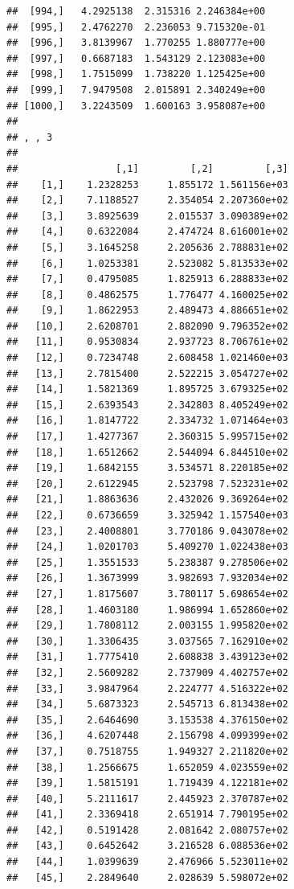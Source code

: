 \documentclass[article]{jss}\usepackage[]{graphicx}\usepackage[]{xcolor}
\makeatletter
\newenvironment{kframe}{%
 \def\at@end@of@kframe{}%
 \ifinner\ifhmode%
  \def\at@end@of@kframe{\end{minipage}}%
  \begin{minipage}{\columnwidth}%
 \fi\fi%
 \def\FrameCommand##1{\hskip\@totalleftmargin \hskip-\fboxsep
 \colorbox{shadecolor}{##1}\hskip-\fboxsep
     \hskip-\linewidth \hskip-\@totalleftmargin \hskip\columnwidth}%
 \MakeFramed {\advance\hsize-\width
   \@totalleftmargin\z@ \linewidth\hsize
   \@setminipage}}%
 {\par\unskip\endMakeFramed%
 \at@end@of@kframe}
\newenvironment{knitrout}{}{} %
\makeatother
\begin{document}
\begin{knitrout}
\begin{kframe}
\begin{verbatim}
##  [994,]   4.2925138  2.315316 2.246384e+00
##  [995,]   2.4762270  2.236053 9.715320e-01
##  [996,]   3.8139967  1.770255 1.880777e+00
##  [997,]   0.6687183  1.543129 2.123083e+00
##  [998,]   1.7515099  1.738220 1.125425e+00
##  [999,]   7.9479508  2.015891 2.340249e+00
## [1000,]   3.2243509  1.600163 3.958087e+00
## 
## , , 3
## 
##                 [,1]         [,2]         [,3]
##    [1,]    1.2328253     1.855172 1.561156e+03
##    [2,]    7.1188527     2.354054 2.207360e+02
##    [3,]    3.8925639     2.015537 3.090389e+02
##    [4,]    0.6322084     2.474724 8.616001e+02
##    [5,]    3.1645258     2.205636 2.788831e+02
##    [6,]    1.0253381     2.523082 5.813533e+02
##    [7,]    0.4795085     1.825913 6.288833e+02
##    [8,]    0.4862575     1.776477 4.160025e+02
##    [9,]    1.8622953     2.489473 4.886651e+02
##   [10,]    2.6208701     2.882090 9.796352e+02
##   [11,]    0.9530834     2.937723 8.706761e+02
##   [12,]    0.7234748     2.608458 1.021460e+03
##   [13,]    2.7815400     2.522215 3.054727e+02
##   [14,]    1.5821369     1.895725 3.679325e+02
##   [15,]    2.6393543     2.342803 8.405249e+02
##   [16,]    1.8147722     2.334732 1.071464e+03
##   [17,]    1.4277367     2.360315 5.995715e+02
##   [18,]    1.6512662     2.544094 6.844510e+02
##   [19,]    1.6842155     3.534571 8.220185e+02
##   [20,]    2.6122945     2.523798 7.523231e+02
##   [21,]    1.8863636     2.432026 9.369264e+02
##   [22,]    0.6736659     3.325942 1.157540e+03
##   [23,]    2.4008801     3.770186 9.043078e+02
##   [24,]    1.0201703     5.409270 1.022438e+03
##   [25,]    1.3551533     5.238387 9.278506e+02
##   [26,]    1.3673999     3.982693 7.932034e+02
##   [27,]    1.8175607     3.780117 5.698654e+02
##   [28,]    1.4603180     1.986994 1.652860e+02
##   [29,]    1.7808112     2.003155 1.995820e+02
##   [30,]    1.3306435     3.037565 7.162910e+02
##   [31,]    1.7775410     2.608838 3.439123e+02
##   [32,]    2.5609282     2.737909 4.402757e+02
##   [33,]    3.9847964     2.224777 4.516322e+02
##   [34,]    5.6873323     2.545713 6.813438e+02
##   [35,]    2.6464690     3.153538 4.376150e+02
##   [36,]    4.6207448     2.156798 4.099399e+02
##   [37,]    0.7518755     1.949327 2.211820e+02
##   [38,]    1.2566675     1.652059 4.023559e+02
##   [39,]    1.5815191     1.719439 4.122181e+02
##   [40,]    5.2111617     2.445923 2.370787e+02
##   [41,]    2.3369418     2.651914 7.790195e+02
##   [42,]    0.5191428     2.081642 2.080757e+02
##   [43,]    0.6452642     3.216528 6.088536e+02
##   [44,]    1.0399639     2.476966 5.523011e+02
##   [45,]    2.2849640     2.028639 5.598072e+02

\end{verbatim}
\end{kframe}
\end{knitrout}
\end{document}
